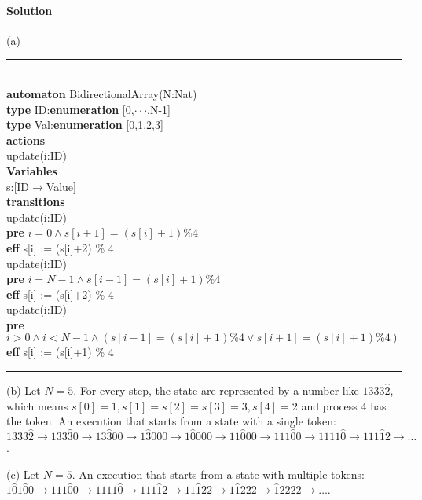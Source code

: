 \documentclass[11pt]{article}
\newcommand{\tab}{\hspace*{5mm}}
\begin{document}
\paragraph{Solution}

(a)

\noindent\rule{7cm}{1.0pt}\\
\textbf{automaton} BidirectionalArray(N:Nat)\\
\tab\textbf{type} ID:\textbf{enumeration} [0,$\cdot\cdot\cdot$,N-1]\\
\tab\textbf{type} Val:\textbf{enumeration} [0,1,2,3]\\
\tab\textbf{actions}\\
\tab\tab update(i:ID)\\
\tab\textbf{Variables}\\
\tab\tab s:[ID$\rightarrow$Value]\\
\tab\textbf{transitions}\\
\tab\tab update(i:ID)\\
\tab\tab\tab\textbf{pre} $i = 0 \wedge s[i+1] = (s[i]+1) \% 4$\\
\tab\tab\tab\textbf{eff} s[i] := (s[i]+2) \% 4\\
\tab\tab update(i:ID)\\
\tab\tab\tab\textbf{pre} $i = N-1 \wedge s[i-1] = (s[i]+1) \% 4$\\
\tab\tab\tab\textbf{eff} s[i] := (s[i]+2) \% 4\\
\tab\tab update(i:ID)\\
\tab\tab\tab\textbf{pre} $i > 0 \wedge i < N-1 \wedge (s[i-1] = (s[i]+1) \% 4 \vee s[i+1] = (s[i]+1) \% 4)$\\
\tab\tab\tab\textbf{eff} s[i] := (s[i]+1) \% 4\\
\noindent\rule{7cm}{1.0pt}

(b) Let $N=5$. For every step, the state are represented by a number like $1333\hat{2}$, which means $s[0]=1,s[1]=s[2]=s[3]=3,s[4]=2$ and process 4 has the token. An execution that starts from a state with a single token: $1333\hat{2} \rightarrow 133\hat{3}0 \rightarrow 13\hat{3}00 \rightarrow 1\hat{3}000 \rightarrow 1\hat{0}000 \rightarrow 11\hat{0}00 \rightarrow 111\hat{0}0 \rightarrow 1111\hat{0} \rightarrow 111\hat{1}2 \rightarrow \dots$.

(c) Let $N=5$. An execution that starts from a state with multiple tokens: $1\hat{0}1\hat{0}0 \rightarrow 111\hat{0}0 \rightarrow 1111\hat{0} \rightarrow 111\hat{1}2 \rightarrow 11\hat{1}22 \rightarrow 1\hat{1}222 \rightarrow \hat{1}2222 \rightarrow \dots$.
\end{document}
